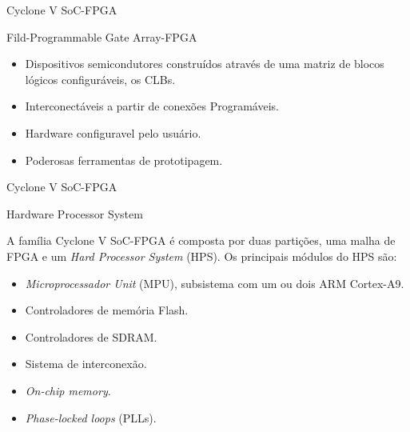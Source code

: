 \documentclass[10pt]{beamer}
\begin{document}
\begin{frame}{Cyclone V SoC-FPGA}
	\begin{alertblock}{Fild-Programmable Gate Array-FPGA}
		\vspace{0.25cm}
		\begin{itemize}
			\setlength\itemsep{1em}
			\item Dispositivos semicondutores construídos através de uma matriz de blocos lógicos configuráveis, os CLBs.
			\item Interconectáveis a partir de conexões Programáveis.
			\item Hardware configuravel pelo usuário.
			\item Poderosas ferramentas de prototipagem.
		\end{itemize}
	\end{alertblock}
\end{frame}

\begin{frame}{Cyclone V SoC-FPGA}
	\begin{alertblock}{Hardware Processor System}
		\vspace{0.1cm}
		\begin{justify}
			 A família Cyclone V SoC-FPGA é composta por duas partições, uma malha de FPGA e um \textit{Hard Processor System} (HPS). Os principais módulos do HPS são:
		\end{justify}
		\begin{itemize}
			\item \textit{Microprocessador Unit} (MPU), subsistema com um ou dois ARM Cortex-A9.
			\item Controladores de memória Flash.
			\item Controladores de SDRAM.
			\item Sistema de interconexão.
			\item \textit{On-chip memory}.
			\item \textit{Phase-locked loops} (PLLs).
		\end{itemize}
	\end{alertblock}
\end{frame}
\end{document}
